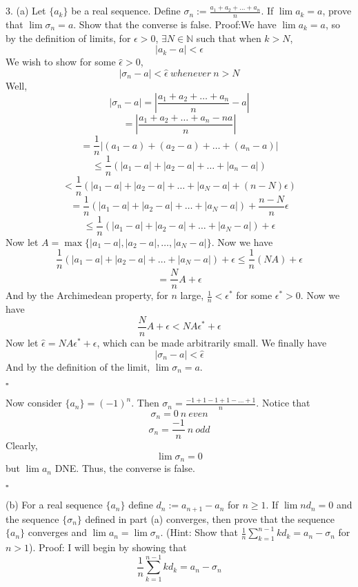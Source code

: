 \documentclass{article}
\begin{document}
\section{}
3. (a) Let $\{a_k\}$ be a real sequence. Define $\sigma_n := \frac{a_1 + a_2 + \ldots + a_n}{n}$. If $\lim a_k = a$, prove that $\lim \sigma_n = a$. Show that the converse is false.
\newline\newline
Proof:We have $\lim{a_k} = a$, so by the definition of limits, for $\epsilon > 0$, $\exists N \in \mathbb{N}$ such that when $k > N$, 
\[|a_k - a |< \epsilon\]
We wish to show for some $\hat{\epsilon} > 0$, 
\[|\sigma_n - a| < \hat{\epsilon} \: whenever \: n > N\]
Well,
\[|\sigma_n - a| = |\frac{a_1 + a_2 + \ldots + a_n}{n} - a|\]
\[= |\frac{a_1 + a_2 + \ldots + a_n - na}{n}|\]
\[= \frac{1}{n} |(a_1 - a) + (a_2 - a) + \ldots + (a_n - a)|\]
\[\leq \frac{1}{n} (|a_1 - a| + |a_2 - a| + \ldots + |a_n - a|)\]
\[< \frac{1}{n} (|a_1 - a| + |a_2 - a| + \ldots + |a_N - a| + (n-N)\epsilon)\]
\[= \frac{1}{n} (|a_1 - a| + |a_2 - a| + \ldots + |a_N - a|)  + \frac{n-N}{n}\epsilon\]
\[\leq \frac{1}{n}(|a_1 - a| + |a_2 - a| + \ldots + |a_N - a|) + \epsilon\]
Now let $A = \max{\{|a_1 - a|, |a_2 - a|, \ldots, |a_N-a|\}}$. Now we have
\[\frac{1}{n}(|a_1 - a| + |a_2 - a| + \ldots + |a_N - a|) + \epsilon \leq \frac{1}{n}(NA) + \epsilon\]
\[= \frac{N}{n}A + \epsilon\]
And by the Archimedean property, for $n$ large, $\frac{1}{n} < \epsilon^*$ for some $\epsilon^* > 0$. Now we have
\[\frac{N}{n}A + \epsilon < NA\epsilon^* + \epsilon\]
Now let $\hat{\epsilon} = NA\epsilon^* + \epsilon$, which can be made arbitrarily small. We finally have
\[|\sigma_n - a| < \hat{\epsilon}\]
And by the definition of the limit, $\lim{\sigma_n} = a$.
\begin{flushright}
    $\square$
\end{flushright}
Now consider $\{a_n\} = (-1)^n$. Then $\sigma_n = \frac{-1 + 1 -1 + 1 - \ldots + 1}{n}$. Notice that 
\[\sigma_n = 0 \:n \:even\]
\[\sigma_n = \frac{-1}{n} \:n \:odd\]
Clearly,
\[\lim{\sigma_n} = 0\]
but $\lim{a_n}$ DNE. Thus, the converse is false.
\begin{flushright}
    $\square$
\end{flushright}
(b) For a real sequence $\{a_n\}$ define $d_n := a_{n+1} - a_n $ for $n \geq 1$. If $\lim nd_n = 0$ and the sequence $\{\sigma_n\}$ defined in part (a) converges, then prove that the sequence $\{a_n\}$ converges and $\lim a_n = \lim \sigma_n$. (Hint: Show that $\frac{1}{n}\sum_{k=1}^{n-1}kd_k = a_n - \sigma_n$ for $n > 1$).
\newline\newline
Proof: I will begin by showing that 
\begin{equation}
    \frac{1}{n}\sum_{k=1}^{n-1}kd_k = a_n - \sigma_n
\end{equation}
\end{document}
